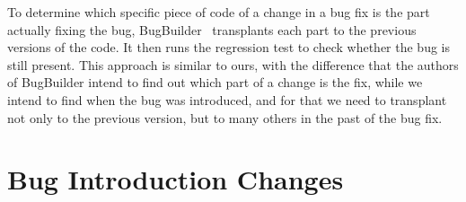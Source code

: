 
To determine which specific piece of code of a change in a bug fix is the part actually fixing the bug, BugBuilder~\cite{jiang2021extracting} transplants each part to the previous versions of the code. It then runs the regression test to check whether the bug is still present. This approach is similar to ours, with the difference that the authors of BugBuilder intend to find out which part of a change is the fix, while we intend to find when the bug was introduced, and for that we need to transplant not only to the previous version, but to many others in the past of the bug fix.





\section{Bug Introduction Changes}

